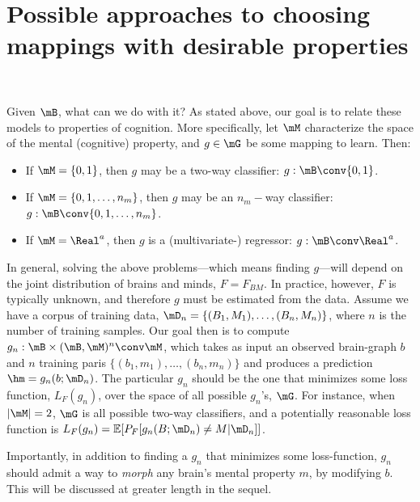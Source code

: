 \section{Possible approaches to choosing mappings with desirable properties} 

\label{sec:possible_approaches_to_choosing_mappings_with_desirable_properties}

Given $\mB$, what can we do with it? As stated above, our goal is to relate these models to properties of cognition. More specifically, let $\mM$ characterize the space of the mental (cognitive) property, and $g \in \mG$ be some mapping to learn. Then:
\begin{itemize}
	\item If $\mM=\{0,1\}$, then $g$ may be a two-way classifier: $g: \mB \conv \{0,1\}$. 
	\item If $\mM=\{0,1,\ldots, n_m\}$, then $g$ may be an $n_m-$way classifier: $g: \mB \conv \{0,1,\ldots,n_m\}$. 
	\item If $\mM=\Real^a$, then $g$ is a (multivariate-) regressor: $g: \mB \conv \Real^a$. 
\end{itemize}

In general, solving the above problems---which means finding $g$---will depend on the joint distribution of brains and minds, $F=F_{BM}$. In practice, however, $F$ is typically unknown, and therefore $g$ must be estimated from the data. Assume we have a corpus of training data, $\mD_n=\{(B_1,M_1), \ldots, (B_n, M_n)\}$, where $n$ is the number of training samples. Our goal then is to compute $g_n: \mB \times (\mB, \mM)^n \conv \mM$, which takes as input an observed brain-graph $b$ and $n$ training paris $\{(b_1,m_1), \ldots, (b_n,m_n)\}$ and produces a prediction $\hm=g_n(b; \mD_n)$. The particular $g_n$ should be the one that minimizes some loss function, $L_F(g_n)$, over the space of all possible $g_n$'s, $\mG$. For instance, when $|\mM|=2$, $\mG$ is all possible two-way classifiers, and a potentially reasonable loss function is $L_F(g_n)=\mathbb{E}[P_F[g_n(B;\mD_n) \neq M | \mD_n]]$.

Importantly, in addition to finding a $g_n$ that minimizes some loss-function, $g_n$ should admit a way to \emph{morph} any brain's mental property $m$, by modifying $b$. This will be discussed at greater length in the sequel. 

\label{sub:finding_a_good_g_n_}

